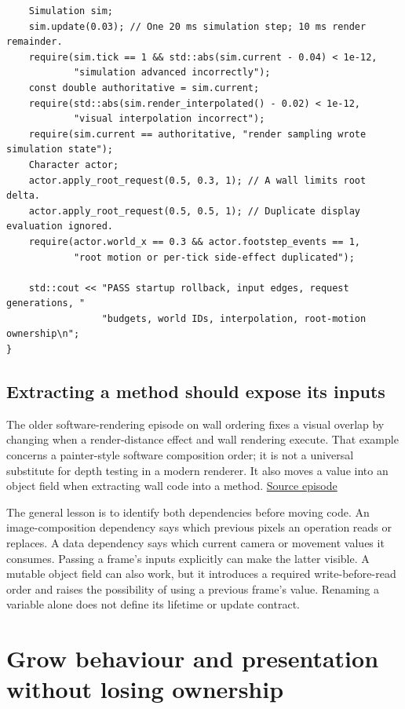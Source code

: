 \begin{verbatim}
    Simulation sim;
    sim.update(0.03); // One 20 ms simulation step; 10 ms render remainder.
    require(sim.tick == 1 && std::abs(sim.current - 0.04) < 1e-12,
            "simulation advanced incorrectly");
    const double authoritative = sim.current;
    require(std::abs(sim.render_interpolated() - 0.02) < 1e-12,
            "visual interpolation incorrect");
    require(sim.current == authoritative, "render sampling wrote simulation state");
    Character actor;
    actor.apply_root_request(0.5, 0.3, 1); // A wall limits root delta.
    actor.apply_root_request(0.5, 0.5, 1); // Duplicate display evaluation ignored.
    require(actor.world_x == 0.3 && actor.footstep_events == 1,
            "root motion or per-tick side-effect duplicated");

    std::cout << "PASS startup rollback, input edges, request generations, "
                 "budgets, world IDs, interpolation, root-motion ownership\n";
}
\end{verbatim}

\subsection{Extracting a method should expose its inputs}\label{06-engine-ii-ch040-extracting-a-method-should-expose-its-inputs}

The older software-rendering episode on wall ordering fixes a visual overlap by changing when a render-distance effect and wall rendering execute. That example concerns a painter-style software composition order; it is not a universal substitute for depth testing in a modern renderer. It also moves a value into an object field when extracting wall code into a method. \href{https://www.youtube.com/watch?v=98K5Bm2sApY}{Source episode}

The general lesson is to identify both dependencies before moving code. An image-composition dependency says which previous pixels an operation reads or replaces. A data dependency says which current camera or movement values it consumes. Passing a frame's inputs explicitly can make the latter visible. A mutable object field can also work, but it introduces a required write-before-read order and raises the possibility of using a previous frame's value. Renaming a variable alone does not define its lifetime or update contract.

\section{Grow behaviour and presentation without losing ownership}\label{06-engine-ii-ch040-grow-behaviour-and-presentation-without-losing-ownership}

